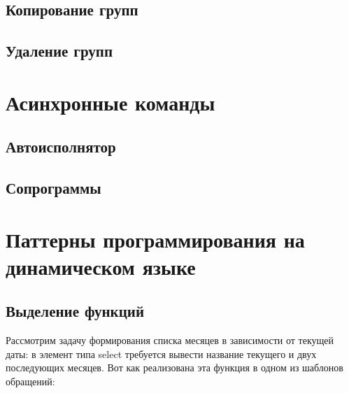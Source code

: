 \documentclass[10pt]{book}
\begin{document}
	\section{Копирование групп}
	
	\section{Удаление групп}
	
	\chapter{Асинхронные команды}
	
	\section{Автоисполнятор}
	
	\section{Сопрограммы}

	\chapter{Паттерны программирования на динамическом языке}
	
	\section{Выделение функций}
	
Рассмотрим задачу формирования списка месяцев в зависимости от текущей даты: в элемент типа select требуется вывести название текущего и двух последующих месяцев. Вот как реализована эта функция в одном из шаблонов обращений:
\end{document}
